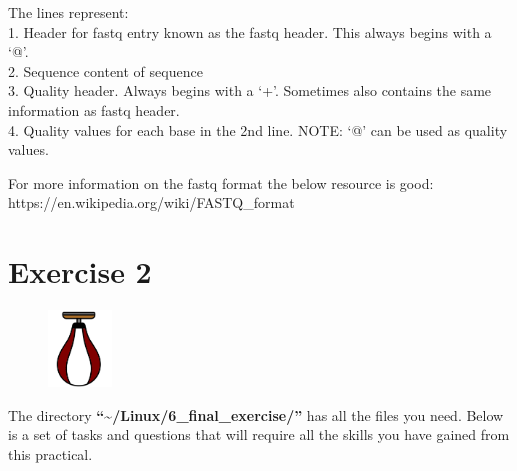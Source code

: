 \documentclass[
  letterpaper,
  DIV=11,
  numbers=noendperiod]{scrreprt}
\begin{document}
The lines represent:\\
1. Header for fastq entry known as the fastq header. This always begins
with a `@'.\\
2. Sequence content of sequence\\
3. Quality header. Always begins with a `+'. Sometimes also contains the
same information as fastq header.\\
4. Quality values for each base in the 2nd line. NOTE: `@' can be used
as quality values.

For more information on the fastq format the below resource is good:
https://en.wikipedia.org/wiki/FASTQ\_format

\hypertarget{exercise-2}{%
\chapter{Exercise 2}\label{exercise-2}}

\begin{figure}

{\centering \includegraphics[width=0.15\textwidth,height=\textheight]{figures/exercise_2.png}

}

\end{figure}

The directory \textbf{``\textasciitilde/Linux/6\_final\_exercise/''} has
all the files you need. Below is a set of tasks and questions that will
require all the skills you have gained from this practical.
\end{document}
